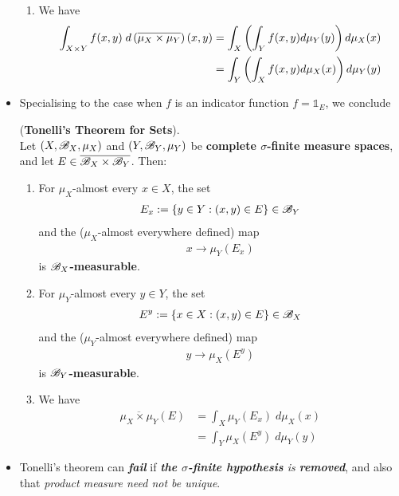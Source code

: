\documentclass[11pt]{article}
\begin{document}
\begin{itemize}
\begin{theorem}
\begin{enumerate}
\item We have
\begin{align}
\int_{X \times Y} f(x, y) \;d\left(\overline{\mu_X \times \mu_Y}\right)(x, y) &= \int_X\left(\int_Y f(x, y) d\mu_Y(y)\right) d\mu_X(x) \nonumber\\
&=  \int_Y\left(\int_Xf(x, y) d\mu_X(x) \right)d\mu_Y(y)  \label{eqn: tonelli_theorem_2}
\end{align}
\end{enumerate}
\end{theorem}

\item Specialising to the case when $f$ is an indicator function $f = \mathds{1}_E$, we conclude
\begin{corollary} (\textbf{Tonelli’s Theorem for Sets}). \citep{tao2011introduction}\\
Let $(X, {\mathscr B}_X, \mu_X)$ and $(Y, {\mathscr B}_Y, \mu_Y)$  be \textbf{complete $\sigma$-finite measure spaces}, and let $E \in \overline{{\mathscr B}_X \times {\mathscr B}_Y}$. Then:
\begin{enumerate}
\item For $\mu_X$-almost every  $x \in X$,  the set
\begin{align*}
E_x := \left\{y \in Y: (x, y) \in E\right\} \in {\mathscr B}_Y
\end{align*} and the ($\mu_X$-almost everywhere defined) map
\begin{align*}
x \to \mu_Y(E_x)
\end{align*} is \textbf{${\mathscr B}_X$-measurable}.

\item  For $\mu_Y$-almost every  $y \in Y$,  the set
\begin{align*}
E^y := \left\{x \in X: (x, y) \in E\right\} \in {\mathscr B}_X
\end{align*} and the ($\mu_Y$-almost everywhere defined) map
\begin{align*}
y \to \mu_X(E^y)
\end{align*} is \textbf{${\mathscr B}_Y$-measurable}.

\item We have
\begin{align}
\overline{\mu_X \times \mu_Y}(E) &= \int_X\mu_Y(E_x)\; d\mu_X(x) \nonumber\\
&=  \int_Y \mu_X(E^y)\;d\mu_Y(y)  \label{eqn: tonelli_theorem_3}
\end{align}
\end{enumerate}
\end{corollary}

\item \begin{remark}
Tonelli’s theorem can \emph{\textbf{fail}} if \emph{\textbf{the $\sigma$-finite hypothesis} is \textbf{removed}}, and also that \emph{product measure need not be unique}.
\end{remark}
\end{itemize}
\end{document}
